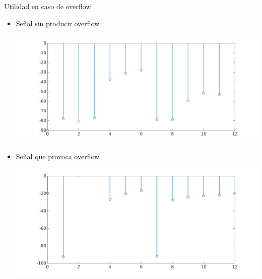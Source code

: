 \begin{frame}{Utilidad en caso de overflow}
  \begin{itemize}
%   
     \item<1-> Señal sin producir overflow
	  \begin{center}
		  \advance\leftskip-0.2cm
		  \includegraphics[scale=0.21]{./figures/r2_16_4096_mul_scale_thd_red.png}
		\end{center}
      \item<2-> Señal que provoca overflow
		\begin{center}
		  \advance\leftskip-0.2cm
		  \includegraphics[scale=0.21]{./figures/r2_16_4096_mul_scale_thd_05_red.png}
		\end{center}
    \end{itemize}
\end{frame}

